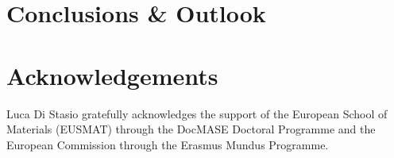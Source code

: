 \documentclass[review]{elsarticle}
\begin{document}
\section{Conclusions \& Outlook}

\section*{Acknowledgements}

Luca Di Stasio gratefully acknowledges the support of the European School of Materials (EUSMAT) through the DocMASE Doctoral Programme and the European Commission through the Erasmus Mundus Programme.


\end{document}
